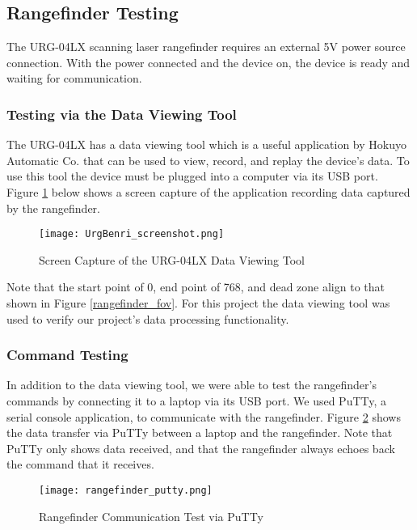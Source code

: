 \subsection{Rangefinder Testing}
The URG-04LX scanning laser rangefinder requires an external 5V power source connection. With the power connected and the device on, the device is ready and waiting for communication.

\subsubsection{Testing via the Data Viewing Tool}
The URG-04LX has a data viewing tool which is a useful application by Hokuyo Automatic Co. that can be used to view, record, and replay the device's data. To use this tool the device must be plugged into a computer via its USB port. Figure \ref{URGBenriStandard_pic} below shows a screen capture of the application recording data captured by the rangefinder.

\begin{figure}[H]
	\centerline{\texttt{[image: UrgBenri\_screenshot.png]}}
	\caption{Screen Capture of the URG-04LX Data Viewing Tool \cite{URGBenriStandard_ref}}
	\label{URGBenriStandard_pic}
\end{figure}

Note that the start point of 0, end point of 768, and dead zone align to that shown in Figure \ref{rangefinder_fov}. For this project the data viewing tool was used to verify our project's data processing functionality.

\subsubsection{Command Testing}
In addition to the data viewing tool, we were able to test the rangefinder's commands by connecting it to a laptop via its USB port. We used PuTTy, a serial console application, to communicate with the rangefinder. Figure \ref{rangefinder_putty} shows the data transfer via PuTTy between a laptop and the rangefinder. Note that PuTTy only shows data received, and that the rangefinder always echoes back the command that it receives.

\begin{figure}[H]
	\centerline{\texttt{[image: rangefinder\_putty.png]}}
	\caption{Rangefinder Communication Test via PuTTy}
	\label{rangefinder_putty}
\end{figure}

